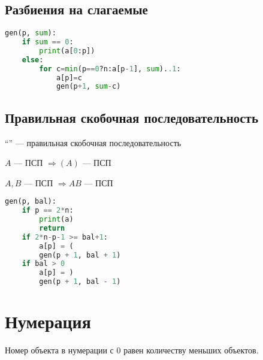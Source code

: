\subsection{Разбиения на слагаемые}
\begin{lstlisting}[frame=single, language=Python, columns=fullflexible]
gen(p, sum):
    if sum == 0:
        print(a[0:p])
    else:
        for c=min(p==0?n:a[p-1], sum)..1:
            a[p]=c
            gen(p+1, sum-c)
\end{lstlisting}
\subsection{Правильная скобочная последовательность}
``'' --- правильная скобочная последовательность

$A$ --- ПСП $\Rightarrow (A)$ --- ПСП

$A,B$ --- ПСП $\Rightarrow AB$ --- ПСП
\begin{lstlisting}[frame=single, language=Python, columns=fullflexible]
gen(p, bal):
    if p == 2*n:
        print(a)
        return
    if 2*n-p-1 >= bal+1:
        a[p] = (
        gen(p + 1, bal + 1)
    if bal > 0
        a[p] = )
        gen(p + 1, bal - 1)
\end{lstlisting}

\section{Нумерация}

Номер объекта в нумерации с $0$ равен количеству меньших объектов.

\begin{lstlisting}[frame=single, language=Python, columns=fullflexible]
\end{lstlisting}
